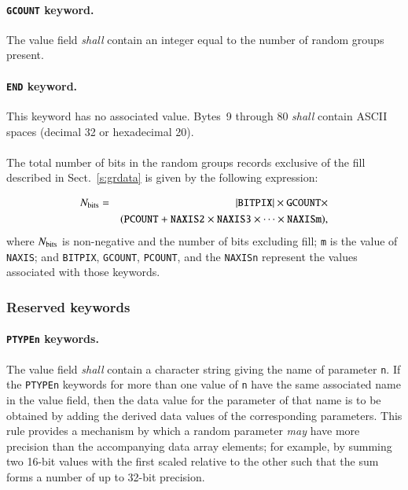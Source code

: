 \documentclass[onecolumn]{aa}
\begin{document}
   \paragraph{{\tt GCOUNT} keyword.}
   The value field {\em shall} contain an integer equal to the
   number of random groups present.
  
   \paragraph{{\tt END} keyword.}
   This keyword has no associated value.  Bytes~9 through 80
   {\em shall} contain ASCII spaces (decimal 32 or hexadecimal 20).

 \paragraph{} The total number of bits in the random groups records 
 exclusive of the fill described in Sect.\ \ref{s:grdata} is
 given by the following
 expression:

\begin{eqnarray}  
   \mbox{$N_{\rm bits}$} &=&  
                     |\mbox{{\tt BITPIX}}| \times 
                     \mbox{{\tt GCOUNT}} \times \nonumber \\
                & &  (\mbox{{\tt PCOUNT}} + \mbox{{\tt NAXIS2}} \times 
                 \mbox{{\tt NAXIS3}} \times  \cdots 
                 \times \mbox{{\tt NAXISm}}),  \label{eq:rdmgsz}
\end{eqnarray}
\noindent
 where $N_{\rm bits}$ is
 non-negative and the number of bits excluding fill; 
 {\tt m} is the value of {\tt NAXIS}; and 
 {\tt BITPIX}, {\tt GCOUNT}, 
 {\tt PCOUNT}, and the {\tt NAXISn}
 represent
 the values associated with those keywords.          
 
  \subsubsection{Reserved keywords}
  \label{s:rgrrk}   
   \paragraph{{\tt PTYPEn} keywords.}
    \label{s:ptyp}
   The value field {\em shall} contain a character string 
   giving
   the name of parameter {\tt n}.  If the {\tt PTYPEn} 
   keywords for more than one value of {\tt n} have the same associated 
   name in the value field, then the data value for the parameter 
   of that name is to be obtained by adding the derived data values 
   of the corresponding parameters.  This rule provides a mechanism by
   which a random parameter {\em may} have more precision than the
   accompanying data array elements; for example, by summing two 16-bit
   values with the first scaled relative to the other such that the
   sum forms a number of up to 32-bit precision. 
 
\end{document}
